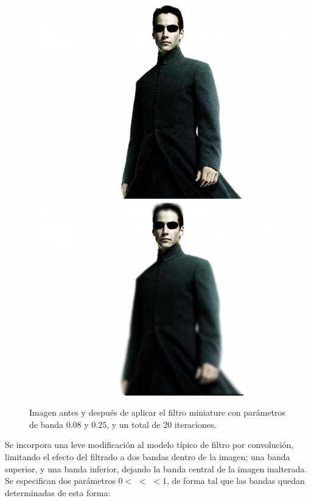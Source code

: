 \begin{figure}[h]
\begin{center}
  \includegraphics[scale=0.2]{secciones/filtro_miniature/imagenes/neo.jpg}
  \includegraphics[scale=0.2]{secciones/filtro_miniature/imagenes/neo-miniature.jpg}
\end{center}
\caption{Imagen antes y después de aplicar el filtro miniature con parámetros de banda $0.08$ y $0.25$, y un total de 20 iteraciones.}
\label{fig:filtro-miniature-ejemplo}
\end{figure}

Se incorpora una leve modificación al modelo típico de filtro por convolución, limitando el efecto del filtrado a dos bandas dentro de la imagen; una banda superior, y una banda inferior, dejando la banda central de la imagen inalterada. Se especifican dos parámetros $0 < $  $<$  $ < 1$, de forma tal que las bandas quedan determinadas de esta forma:

